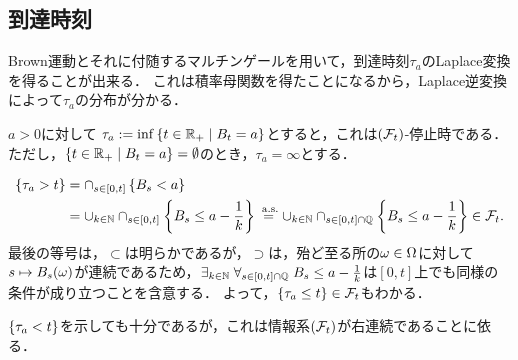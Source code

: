 \documentclass[uplatex,dvipdfmx]{jsreport}
\begin{document}
\subsection{到達時刻}

\begin{tcolorbox}[colframe=ForestGreen, colback=ForestGreen!10!white,breakable,colbacktitle=ForestGreen!40!white,coltitle=black,fonttitle=\bfseries\sffamily,
title=Markov過程の到達時刻はLaplace変換の有名な応用先である]
    Brown運動とそれに付随するマルチンゲールを用いて，到達時刻$\tau_a$のLaplace変換を得ることが出来る．
    これは積率母関数を得たことになるから，Laplace逆変換によって$\tau_a$の分布が分かる．
\end{tcolorbox}

\begin{lemma}[到達時刻]
    $a>0$に対して
    $\tau_a:=\inf\left\{t\in\mathbb{R}_+\mid B_t=a\right\}$とすると，これは$(\mathcal{F}_t)$-停止時である．
    ただし，$\left\{t\in\mathbb{R}_+\mid B_t=a\right\}=\emptyset$のとき，$\tau_a=\infty$とする．
\end{lemma}
\begin{Proof}
    \begin{align*}
        \left\{\tau_a>t\right\}&=\cap_{s\in[0,t]}\left\{B_s<a\right\}\\
        &=\cup_{k\in\mathbb{N}}\cap_{s\in[0,t]}\left\{B_s\le a-\frac{1}{k}\right\}\overset{\;\mathrm{a.s.}}{=}\cup_{k\in\mathbb{N}}\cap_{s\in[0,t]\cap\mathbb{Q}}\left\{B_s\le a-\frac{1}{k}\right\}\in\mathcal{F}_t.
    \end{align*}
    最後の等号は，$\subset$は明らかであるが，$\supset$は，殆ど至る所の$\omega\in\Omega$に対して$s\mapsto B_s(\omega)$が連続であるため，$\exists_{k\in\mathbb{N}}\;\forall_{s\in[0,t]\cap\mathbb{Q}}\;B_s\le a-\frac{1}{k}$は$[0,t]$上でも同様の条件が成り立つことを含意する．
    よって，$\left\{\tau_a\le t\right\}\in\mathcal{F}_t$もわかる．
\end{Proof}
\begin{remarks}
    $\left\{\tau_a<t\right\}$を示しても十分であるが，これは情報系$(\mathcal{F}_t)$が右連続であることに依る．
\end{remarks}
\end{document}
